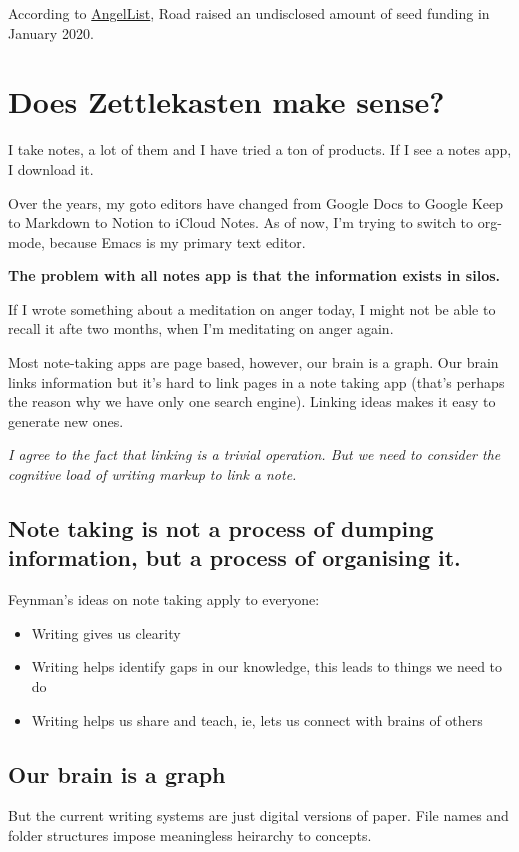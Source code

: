 \documentclass[11pt]{article}
\begin{document}
According to \href{https://angel.co/company/roam-research/funding}{AngelList}, Road raised an undisclosed amount of seed funding in January 2020.

\section{Does Zettlekasten make sense?}
\label{sec:orgd731f22}
I take notes, a lot of them and I have tried a ton of products. If I see a notes app, I download it.

Over the years, my goto editors have changed from Google Docs to Google Keep to Markdown to Notion to iCloud Notes.
As of now, I'm trying to switch to org-mode, because Emacs is my primary text editor.

\textbf{The problem with all notes app is that the information exists in silos.}

If I wrote something about a meditation on anger today, I might not be able to recall it afte two months, when I'm meditating on anger again.

Most note-taking apps are page based, however, our brain is a graph. Our brain links information but it's hard
to link pages in a note taking app (that's perhaps the reason why we have only one search engine). Linking ideas makes it easy to generate new ones.

\emph{I agree to the fact that linking is a trivial operation. But we need to consider the cognitive load of writing markup to link a note.}

\subsection{Note taking is not a process of dumping information, but a process of organising it.}
\label{sec:org85c42a1}

Feynman's ideas on note taking apply to everyone:
\begin{itemize}
\item Writing gives us clearity
\item Writing helps identify gaps in our knowledge, this leads to things we need to do
\item Writing helps us share and teach, ie, lets us connect with brains of others
\end{itemize}

\subsection{Our brain is a graph}
\label{sec:org7a02506}
But the current writing systems are just digital versions of paper. File names and folder structures impose meaningless heirarchy to concepts.
\end{document}
